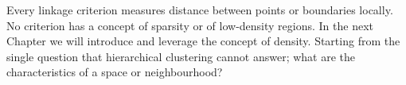 
 Every linkage criterion measures
distance between points or boundaries locally. No criterion has a concept of
sparsity or of low-density regions. In the next Chapter we will introduce and leverage the concept
of density. Starting from the single question that hierarchical clustering cannot answer; 
what are the characteristics of a space or neighbourhood?


